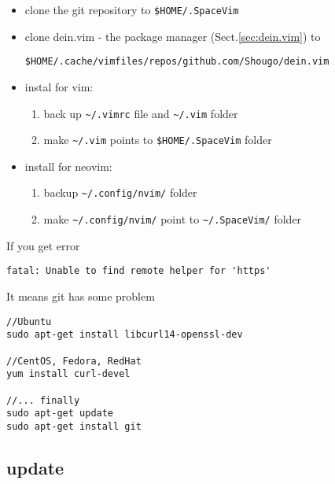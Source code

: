 \begin{itemize}
  \item clone the git repository to \verb!$HOME/.SpaceVim!

    \item clone dein.vim - the package manager (Sect.\ref{sec:dein.vim}) to
  
\begin{verbatim}
$HOME/.cache/vimfiles/repos/github.com/Shougo/dein.vim
\end{verbatim}
  
  \item instal for vim:
  
  \begin{enumerate}
    \item back up \verb!~/.vimrc! file and \verb!~/.vim! folder
  
    \item make \verb!~/.vim! points to \verb!$HOME/.SpaceVim! folder
  
  \end{enumerate}
  
  \item install for neovim: \label{sec:nvim-SpaceVim}

  \begin{enumerate}
    
    \item backup \verb!~/.config/nvim/! folder
    
    \item make \verb!~/.config/nvim/! point to \verb!~/.SpaceVim/! folder
    
  \end{enumerate}
\end{itemize}

If you get error
\begin{verbatim}
fatal: Unable to find remote helper for 'https'
\end{verbatim}

It means git has some problem
\begin{verbatim}
//Ubuntu
sudo apt-get install libcurl14-openssl-dev

//CentOS, Fedora, RedHat
yum install curl-devel

//... finally 
sudo apt-get update
sudo apt-get install git
\end{verbatim}


\subsection{update}

